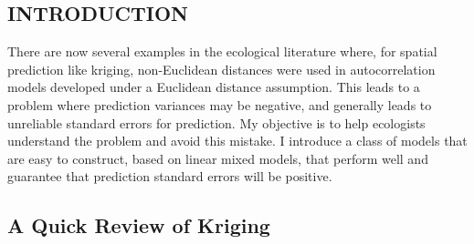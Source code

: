 \documentclass[11pt, titlepage]{article}\usepackage[]{graphicx}\usepackage[]{color}
\begin{document}

\newpage
\begin{spacing}{1.9}
\begin{flushleft}
\setlength{\parindent}{1cm}



\section*{INTRODUCTION}

There are now several examples in the ecological literature where, for spatial prediction like kriging, non-Euclidean distances were used in autocorrelation models developed under a Euclidean distance assumption.  This leads to a problem where prediction variances may be negative, and generally leads to unreliable standard errors for prediction.  My objective is to help ecologists understand the problem and avoid this mistake.  I introduce a class of models that are easy to construct, based on linear mixed models, that perform well and guarantee that prediction standard errors will be positive.

\subsection*{A Quick Review of Kriging}


\end{flushleft}
\end{spacing}
\end{document}
